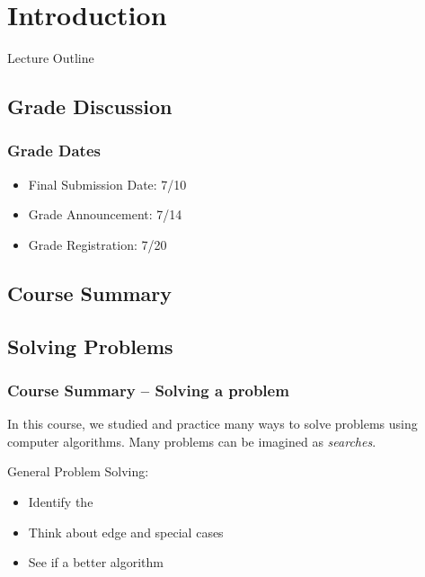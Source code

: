 \section{Introduction}

\begin{frame}{Lecture Outline}
\end{frame}

\subsection{Grade Discussion}

\begin{frame}
  \frametitle{Grade Dates}

  \begin{itemize}
  \item Final Submission Date: 7/10
    \bigskip

  \item Grade Announcement: 7/14
    \bigskip

  \item Grade Registration: 7/20
  \end{itemize}
\end{frame}

\subsection{Course Summary}

\subsection{Solving Problems}
\begin{frame}
  \frametitle{Course Summary -- Solving a problem}

  \begin{block}{}
    In this course, we studied and practice many ways
    to solve problems using computer algorithms. Many
    problems can be imagined as \emph{searches}.
  \end{block}

  \vfill

  General Problem Solving:
  \begin{itemize}
  \item Identify the 
  \item Think about edge and special cases
  \item See if a better algorithm 
  \end{itemize}

\end{frame}

